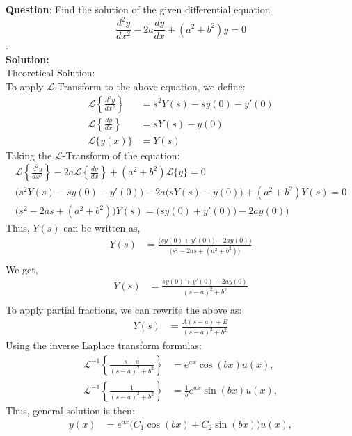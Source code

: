\documentclass[journal]{IEEEtran}
\begin{document}
	
	\textbf{Question}:\newline
	Find the solution of the given differential equation$$\frac{d^2y}{dx^2} - 2a \frac{dy}{dx} + (a^2 + b^2)y = 0 $$. \\
	\textbf{Solution: }\\
	Theoretical Solution: \\
	To apply $\mathcal{L}$-Transform to the above equation, we define:
	\begin{align}
		\mathcal{L}\left\{\frac{d^2y}{dx^2}\right\} &= s^2 Y(s) - s y(0) - y'(0) \\
		\mathcal{L}\left\{\frac{dy}{dx}\right\} &= s Y(s) - y(0) \\
		\mathcal{L}\{y(x)\} &= Y(s)
	\end{align}
	Taking the $\mathcal{L}$-Transform of the equation:
	\begin{align}
		\mathcal{L}\left\{\frac{d^2y}{dx^2}\right\} - 2a \mathcal{L}\left\{\frac{dy}{dx}\right\} + (a^2 + b^2) \mathcal{L}\{y\} = 0 \\
		\big(s^2 Y(s) - s y(0) - y'(0)\big) - 2a \big(s Y(s) - y(0)\big) + (a^2 + b^2) Y(s) = 0 \\
		\big(s^2 - 2as + (a^2 + b^2)\big) Y(s) = \big(s y(0) + y'(0)\big) - 2a y(0))
	\end{align}
	Thus, $Y(s)$ can be written as, 
	\begin{align}
	 	Y(s) &= \frac{\big(s y(0) + y'(0)\big) - 2a y(0))}{	\big(s^2 - 2as + (a^2 + b^2)\big)}\\
	\end{align}
	We get, 
	\begin{align}
		Y(s) &= \frac{s y(0) + y'(0) - 2a y(0)}{(s - a)^2 + b^2}\\
	\end{align}
	To apply partial fractions, we can rewrite the above as:
	\begin{align}
				Y(s) &= \frac{A(s - a) + B}{(s - a)^2 + b^2} \label{Y}
	\end{align}
	Using the inverse Laplace transform formulas:
	\begin{align}
		\mathcal{L}^{-1}\left\{\frac{s - a}{(s - a)^2 + b^2}\right\} &= e^{ax} \cos(bx)u(x), \\
		\mathcal{L}^{-1}\left\{\frac{1}{(s - a)^2 + b^2}\right\} &= \frac{1}{b} e^{ax} \sin(bx)u(x),
	\end{align}
	Thus, general solution is then:
	\begin{align}
		y(x) &= e^{ax} \big(C_1 \cos(bx) + C_2 \sin(bx)\big)u(x),
	\end{align}
\end{document}

